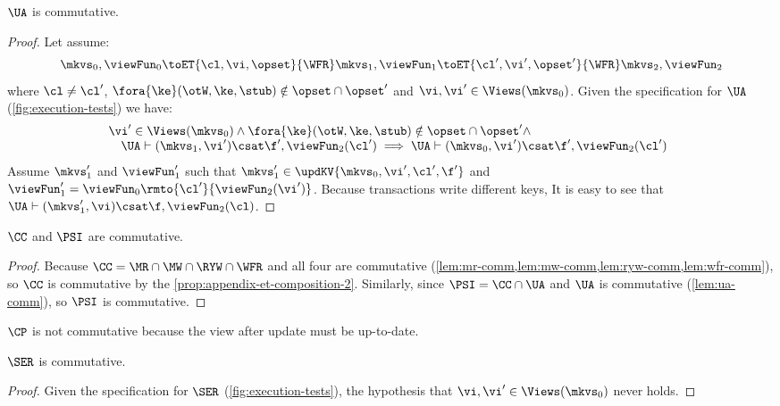 \begin{lemma}
    \label{lem:ua-comm}
    \(\UA\) is commutative.
\end{lemma}
\begin{proof}
    Let assume:
    \[
        \mkvs_0, \viewFun_0 \toET{\cl, \vi, \opset}{\WFR} \mkvs_1, \viewFun_1 \toET{\cl', \vi', \opset'}{\WFR} \mkvs_2, \viewFun_2 
    \]
    where \( \cl \neq \cl' \), \( \fora{ \ke } (\otW, \ke, \stub) \notin \opset \cap \opset' \) and \( \vi, \vi' \in \Views(\mkvs_0)\).
    Given the specification for \( \UA \) (\cref{fig:execution-tests}) we have:
    \[
        \begin{array}{@{}l}
            \vi' \in \Views(\mkvs_0) \land \fora{ \ke } (\otW, \ke, \stub) \notin \opset \cap \opset' \land \\ 
            \quad \UA \vdash (\mkvs_1, \vi') \csat \f', \viewFun_2(\cl') \implies  \UA \vdash (\mkvs_0, \vi') \csat \f', \viewFun_2(\cl')
        \end{array}
    \]
    Assume \( \mkvs'_1 \) and \( \viewFun'_1 \) such that \( \mkvs'_1 \in \updKV{\mkvs_0,\vi',\cl',\f'} \) and \( \viewFun'_1 = \viewFun_0\rmto{\cl'}{\viewFun_2(\vi')} \).
    Because transactions write different keys, It is easy to see that \( \UA \vdash (\mkvs'_1, \vi) \csat \f, \viewFun_2(\cl) \).
\end{proof}

\begin{proposition}
    \( \CC \) and \( \PSI \) are commutative.
\end{proposition}
\begin{proof}
    Because \( \CC = \MR \cap \MW \cap \RYW \cap \WFR \) and all four are commutative (\cref{lem:mr-comm,lem:mw-comm,lem:ryw-comm,lem:wfr-comm}), so \( \CC \) is commutative by the \cref{prop:appendix-et-composition-2}.
    Similarly, since \( \PSI = \CC \cap \UA \) and \( \UA \) is commutative (\cref{lem:ua-comm}), so \( \PSI \) is commutative.
\end{proof}

\( \CP \) is not commutative because the view after update must be up-to-date.

\begin{lemma}
    \label{lem:ser-comm}
    \( \SER \) is commutative.
\end{lemma}
\begin{proof}
    Given the specification for \( \SER \) (\cref{fig:execution-tests}), the hypothesis that \( \vi, \vi' \in \Views(\mkvs_0) \) never holds.
\end{proof}

